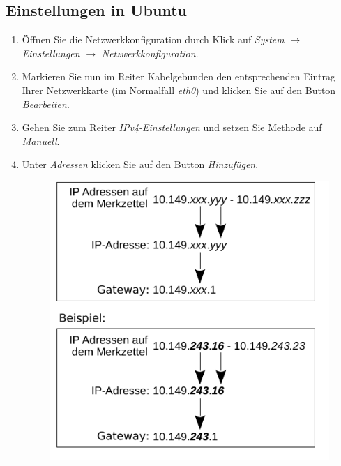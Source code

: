 \documentclass[a4paper,12pt]{scrartcl}
\begin{document}
\subsection*{Einstellungen in Ubuntu}
\begin{enumerate}
    \item Öffnen Sie die Netzwerkkonfiguration durch Klick auf \emph{System} $\rightarrow$ \emph{Einstellungen} $\rightarrow$ \emph{Netzwerkkonfiguration}.
    \item Markieren Sie nun im Reiter Kabelgebunden den entsprechenden Eintrag Ihrer Netzwerkkarte (im Normalfall \emph{eth0}) und klicken Sie auf den Button \emph{Bearbeiten}.
    \item Gehen Sie zum Reiter \emph{IPv4-Einstellungen} und setzen Sie Methode auf \emph{Manuell}.
    \item Unter \emph{Adressen} klicken Sie auf den Button \emph{Hinzufügen}.
      \begin{figure}[h!]
        \centering
        \begin{minipage}[c]{0.45\linewidth}
          \centering
          \includegraphics[width=\linewidth,keepaspectratio]{Bilder/IP_Gerneric_mb}
        \end{minipage}
        \begin{minipage}[c]{0.5\linewidth}
          \centering

\end{minipage}
\end{figure}
\end{enumerate}
\end{document}

